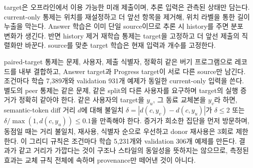 \documentclass[10pt,conference]{IEEEtran}
\begin{document}
target은 오프라인에서 이용 가능한 미래 제출이며, 추론 입력은 관측된 상태만 담는다. current-only 통제는 위치를 재설정하고 더 앞선 항목을 제거해, 위치 라벨을 통한 길이 누출을 막는다. Answer 학습은 이미 단일 source이므로 추론 시 history를 주면 분포 변화가 생긴다. 반면 history 제거 재학습 통제는 target을 고정하고 더 앞선 제출의 직렬화만 바꾼다. source를 맞춘 target 학습은 현재 입력과 개수를 고정한다.

paired-target 통제는 문제, 사용자, 제출 식별자, 정확히 같은 버기 프로그램으로 레코드를 내부 결합하고, Answer target과 Progress target이 서로 다른 source만 남긴다. 조건마다 학습 7,389개와 validation 931개 예제가 동일한 current-only 입력을 쓴다. 별도의 peer 통제는 같은 문제, 같은 split의 다른 사용자를 요구하며 target의 실행 증거가 정확히 같아야 한다. 같은 사용자의 target을 \(y_u\), 그 동료 교체본을 \(y_v\)라 하면, semantic-token diff 거리 \(d\)에 대해 불일치 \(\delta=|d(c,y_v)-d(c,y_u)|\)가 \(\delta\le2\) 또는 \(\delta/\max(1,d(c,y_u))\le0.1\)을 만족해야 한다. 증거가 희소한 집단을 먼저 방문하며, 동점일 때는 거리 불일치, 재사용, 식별자 순으로 우선하고 donor 재사용은 3회로 제한한다. 이 그리디 규칙은 조건마다 학습 5,231개와 validation 306개 예제를 만든다. 결과가 같고 거리가 가깝다는 것이 구조나 스타일의 동일성을 뜻하지는 않으므로, 측정된 효과는 교체 규칙 전체에 속하며 provenance만 떼어낸 것이 아니다.
\end{document}
